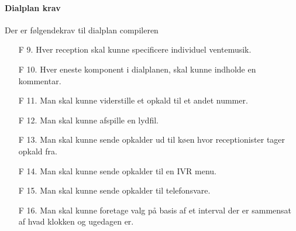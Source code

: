 \paragraph{Dialplan krav}
Der er følgendekrav til dialplan compileren
\begin{enumerate}
  \item[F 9.] Hver reception skal kunne specificere individuel ventemusik.
  \item[F 10.] Hver eneste komponent i dialplanen, skal kunne indholde en kommentar.
  \item[F 11.] Man skal kunne viderstille et opkald til et andet nummer.
  \item[F 12.] Man skal kunne afspille en lydfil.
  \item[F 13.] Man skal kunne sende opkalder ud til køen hvor receptionister tager opkald fra.
  \item[F 14.] Man skal kunne sende opkalder til en IVR menu.
  \item[F 15.] Man skal kunne sende opkalder til telefonsvare.
  \item[F 16.] Man skal kunne foretage valg på basis af et interval der er sammensat af hvad klokken og ugedagen er.
\end{enumerate}
